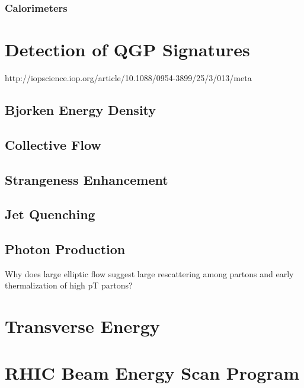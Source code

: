 \subsubsection{Calorimeters}
\section{Detection of QGP Signatures}
http://iopscience.iop.org/article/10.1088/0954-3899/25/3/013/meta
\subsection{Bjorken Energy Density}
\subsection{Collective Flow}
\subsection{Strangeness Enhancement}
\subsection{Jet Quenching}
\subsection{Photon Production}
Why does large elliptic flow suggest large rescattering among partons and early thermalization of high pT partons? 
\section{Transverse Energy}
\section{RHIC Beam Energy Scan Program}
